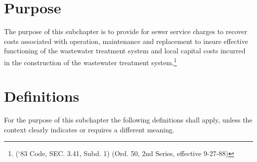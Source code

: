 
\setcounter{section}{54}
\section{Purpose}
The purpose of this subchapter is to provide for sewer service charges to recover costs associated with operation, maintenance and replacement to insure effective functioning of the wastewater treatment system and local capital costs incurred in the construction of the wastewater treatment system.\footnote{(‘83 Code, SEC. 3.41, Subd. 1) (Ord. 50, 2nd Series, effective 9-27-88)}

\section{Definitions}
For the purpose of this subchapter the following definitions shall apply, unless the context clearly indicates or requires a different meaning.
